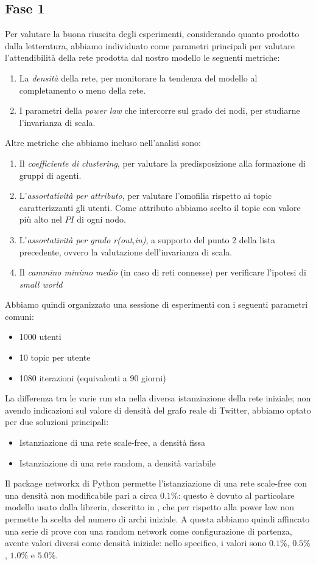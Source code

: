 \documentclass[a4paper,12pt]{article}
\begin{document}
\subsection{Fase 1}
Per valutare la buona riuscita degli esperimenti, considerando quanto prodotto dalla letteratura, abbiamo individuato come parametri principali per valutare l'attendibilità della rete prodotta dal nostro modello le seguenti metriche:
\begin{enumerate}
    \item La \textit{densità} della rete, per monitorare la tendenza del modello al completamento o meno della rete.
    \item I parametri della \textit{power law} che intercorre sul grado dei nodi, per studiarne l'invarianza di scala.
\end{enumerate}
Altre metriche che abbiamo incluso nell'analisi sono:
\begin{enumerate}
    \item Il \textit{coefficiente di clustering}, per valutare la predisposizione alla formazione di gruppi di agenti.
    \item L'\textit{assortatività per attributo}, per valutare l'omofilia rispetto ai topic caratterizzanti gli utenti. Come attributo abbiamo scelto il topic con valore più alto nel $PI$ di ogni nodo.
    \item L'\textit{assortatività per grado r(out,in)}, a supporto del punto 2 della lista precedente, ovvero la valutazione dell'invarianza di scala.
    \item Il \textit{cammino minimo medio} (in caso di reti connesse) per verificare l'ipotesi di \textit{small world}
\end{enumerate}
Abbiamo quindi organizzato una sessione di esperimenti con i seguenti parametri comuni:
\begin{itemize}
\item 1000 utenti
\item 10 topic per utente
\item 1080 iterazioni (equivalenti a 90 giorni)
\end{itemize}
La differenza tra le varie run sta nella diversa istanziazione della rete iniziale; non avendo indicazioni sul valore di densità del grafo reale di Twitter, abbiamo optato per due soluzioni principali:
\begin{itemize}
\item Istanziazione di una rete scale-free, a densità fissa
\item Istanziazione di una rete random, a densità variabile
\end{itemize}
Il package networkx di Python permette l'istanziazione di una rete scale-free con una densità non modificabile pari a circa $0.1\%$: questo è dovuto al particolare modello usato dalla libreria, descritto in \cite{sfnx}, che per rispetto alla power law non permette la scelta del numero di archi iniziale.
A questa abbiamo quindi affincato una serie di prove con una random network come configurazione di partenza, avente valori diversi come densità iniziale: nello specifico, i valori sono $0.1\%$, $0.5\%$, $1.0\%$ e $5.0\%$.
\end{document}

